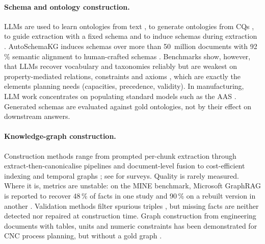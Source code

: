 \paragraph{Schema and ontology construction.}
\acp{LLM} are used to learn ontologies from text \parencite{babaeigiglou2023llms4ol}, to generate ontologies from \acp{CQ} \parencite{lippolis2025ontology}, to guide extraction with a fixed schema \parencite{mihindukulasooriya2023text2kgbench} and to induce schemas during extraction \parencite{zhang2024edc,bai2026autoschemakg}. AutoSchemaKG induces schemas over more than 50~million documents with 92\,\% semantic alignment to human-crafted schemas \parencite{bai2026autoschemakg}. Benchmarks show, however, that \acp{LLM} recover vocabulary and taxonomies reliably but are weakest on property-mediated relations, constraints and axioms \parencite{zhang2026ontourl,li2026cq4oe}, which are exactly the elements planning needs (capacities, precedence, validity). In manufacturing, \ac{LLM} work concentrates on populating standard models such as the \ac{AAS} \parencite{xia2024aas}. Generated schemas are evaluated against gold ontologies, not by their effect on downstream answers.

\paragraph{Knowledge-graph construction.}
Construction methods range from prompted per-chunk extraction \parencite{edge2024local,gutierrez2024hipporag} through extract-then-canonicalise pipelines \parencite{zhang2024edc,mo2025kggen} and document-level fusion \parencite{zhang2025rakg} to cost-efficient indexing \parencite{guo2025lightrag,huang2025ketrag} and temporal graphs \parencite{rasmussen2025zep}; see \parencite{zhong2024survey,pan2024unifying} for surveys. Quality is rarely measured. Where it is, metrics are unstable: on the MINE benchmark, Microsoft GraphRAG is reported to recover 48\,\% of facts in one study \parencite{mo2025kggen} and 90\,\% on a rebuilt version in another \parencite{zhang2025rakg}. Validation methods filter spurious triples \parencite{huang2024graphjudge}, but missing facts are neither detected nor repaired at construction time. Graph construction from engineering documents with tables, units and numeric constraints has been demonstrated for CNC process planning, but without a gold graph \parencite{hoang2025arkness}.

